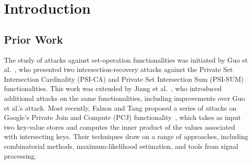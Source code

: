 \section{Introduction}

\cite{USENIX:DZBC25,USENIX:TBZCC25,USENIX:JSZG24, USENIX:ZCLZL23,USENIX:JSZDG22,CCS:GNBT25,CCS:ZCLPHW24, CCS:TCLZ23,ASIACCS:CSSW25,ASIACCS:BlaAgu12,AC:LiuGao23,AC:KRTW19,PoPETS:GaoNguTri24,
ACNS:Frikken07,C:KisSon05}


\subsection{Prior Work}

 The study of attacks against set-operation functionalities was initiated by Guo et al.~\cite{USENIX:GHLWJL22}, who presented two intersection-recovery attacks against the Private Set Intersection Cardinality (PSI-CA) and Private Set Intersection Sum (PSI-SUM) functionalities. This work was extended by Jiang et al.~\cite{NDSS:JiaDuYan24}, who introduced additional attacks on the same functionalities, including improvements over Guo et al.’s attack. Most recently, Falzon and Tang \cite{USENIX:FalTan25} proposed a series of attacks on Google’s Private Join and Compute (PCJ) functionality~\cite{AC:LPRST21}, which takes as input two key-value stores and computes the inner product of the values associated with intersecting keys. Their techniques draw on a range of approaches, including combinatorial methods, maximum-likelihood estimation, and tools from signal processing.


